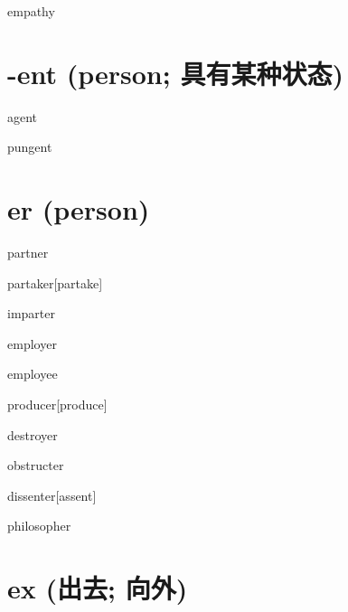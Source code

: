 \begin{RefWord}{empathy}
\end{RefWord}

\section{-ent (person; 具有某种状态)}

\begin{RefWord}{agent}
\end{RefWord}

\begin{RefWord}{pungent}
\end{RefWord}

\section{er (person)}

\begin{RefWord}{partner}
\end{RefWord}

\begin{RefWord}{partaker}[partake]
\end{RefWord}

\begin{RefWord}{imparter}
\end{RefWord}

\begin{RefWord}{employer}
\end{RefWord}

\begin{RefWord}{employee}
\end{RefWord}

\begin{RefWord}{producer}[produce]
\end{RefWord}

\begin{RefWord}{destroyer}
\end{RefWord}

\begin{RefWord}{obstructer}
\end{RefWord}

\begin{RefWord}{dissenter}[assent]
\end{RefWord}

\begin{RefWord}{philosopher}
\end{RefWord}

\section{ex (出去; 向外)}

